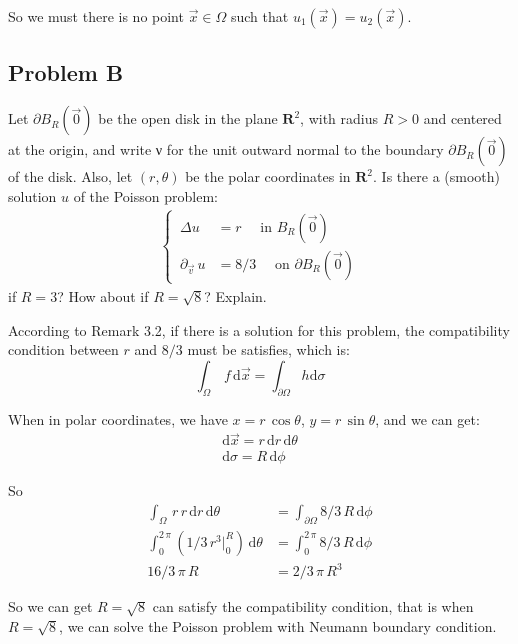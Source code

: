 \documentclass[../main.tex]{subfiles}
\begin{document}
So we must there is no point $\vec{x} \in \Omega$ such that $u_1(\vec{x}) = u_2(\vec{x})$.

\subsection{Problem B}

Let $\partial B_R(\vec{0})$ be the open disk in the plane $\mathbf{R}^2$, with radius $R > 0$ and centered at the origin, and write ν for the unit outward normal to the boundary $\partial B_R(\vec{0})$ of the disk. Also, let $(r, \theta)$ be the polar coordinates in $\mathbf{R}^2$. Is there a (smooth) solution $u$ of the Poisson problem:
\begin{align} 
    \begin{cases} \label{eq:A3_27}
        \, \Delta u &= r \quad \text{ in  } B_R(\vec{0}) \\
        \, \partial_{\vec{v}} \, u & = 8/3 \quad \text{ on  } \partial B_R(\vec{0})
    \end{cases}
\end{align}
if $R = 3$? How about if $R = \sqrt{8}$? Explain.

According to Remark 3.2, if there is a solution for this problem, the compatibility condition between $r$ and $8/3$ must be satisfies, which is:
\begin{equation}
    \int_{\Omega} \, f \, \mathrm{d} \vec{x} = \int_{\partial \Omega} h \mathrm{d} \sigma
\end{equation}

When in polar coordinates, we have $x = r \, \cos{\theta}$, $y = r \, \sin{\theta}$, and we can get:
\begin{align}
    \mathrm{d} \vec{x} = r \, \mathrm{d} r \, \mathrm{d} \theta \\
    \mathrm{d}\sigma = R \, \mathrm{d} \phi
\end{align}

So
\begin{align}
    \int_{\Omega} \, r \, r \, \mathrm{d} r \, \mathrm{d} \theta &= \int_{\partial \Omega} 8/3 \, R \, \mathrm{d} \phi \\
    \int_0^{2 \, \pi} (1/3 \, r^3 |_0^R) \, \mathrm{d} \theta &= \int_0^{2 \, \pi} 8/3 \, R \, \mathrm{d} \phi \\
    16/3 \, \pi \, R &= 2/3 \, \pi \, R^3 
\end{align}

So we can get $R = \sqrt{8}$ can satisfy the compatibility condition, that is when $R = \sqrt{8}$, we can solve the Poisson problem with Neumann boundary condition.
\end{document}
